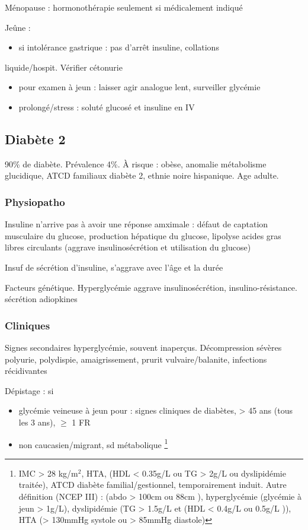 \documentclass[11pt]{article}
\begin{document}
Ménopause : hormonothérapie seulement si médicalement indiqué

Jeûne : 
\begin{itemize}
\item si intolérance gastrique : pas d'arrêt insuline, collations
\end{itemize}
liquide/hospit. Vérifier cétonurie
\begin{itemize}
\item pour examen à jeun : laisser agir analogue lent, surveiller glycémie
\item prolongé/stress : soluté glucosé et insuline en IV
\end{itemize}

\subsection{Diabète 2}
\label{sec:orge9ef09d}
90\% de diabète. Prévalence 4\%. À risque : obèse, anomalie métabolisme
glucidique, ATCD familiaux diabète 2, ethnie noire hispanique.
Age adulte.

\subsubsection{Physiopatho}
\label{sec:org0a4b511}
Insuline n'arrive pas à avoir une réponse amximale : défaut de captation
musculaire du glucose, \inc production hépatique du glucose, lipolyse \inc acides gras
libres circulants \thus (aggrave \dec insulinosécrétion et utilisation du glucose)

Insuf de sécrétion d'insuline, s'aggrave avec l'âge et la durée

Facteurs génétique. Hyperglycémie aggrave insulinosécrétion,
insulino-résistance. \dec sécrétion adiopkines

\subsubsection{Cliniques}
\label{sec:org33d6fa3}
Signes secondaires hyperglycémie, souvent inaperçus. Décompression sévères \thus
polyurie, polydispie, amaigrissement, prurit vulvaire/balanite, infections
récidivantes

Dépistage : si
\begin{itemize}
\item glycémie veineuse à jeun pour : signes cliniques de diabètes, > 45 ans (tous les 3 ans), \(\ge\) 1 FR
\item non caucasien/migrant, sd métabolique \footnote{IMC > 28 kg/m\(^{\text{2}}\), HTA, (HDL < 0.35g/L ou
  TG > 2g/L ou dyslipidémie traitée), ATCD diabète familial/gestionnel,
  temporairement induit.
Autre définition (NCEP III) : (\diameter abdo > 100cm \male ou 88cm \female), hyperglycémie
  (glycémie à jeun > 1g/L), dyslipidémie (TG > 1.5g/L et (HDL < 0.4g/L \male ou
  0.5g/L \female)), HTA (> 130mmHg systole ou > 85mmHg diastole)}
\end{itemize}
\end{document}
